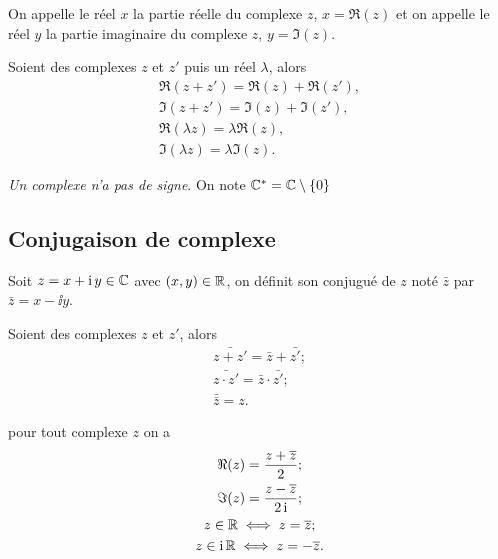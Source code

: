 %
On appelle le réel \(x\) la partie réelle du complexe \(z\), \(x=\Re(z)\) et on appelle le réel \(y\) la partie imaginaire du complexe \(z\), \(y=\Im(z)\).
%
\begin{prop}
  Soient des complexes \(z\) et \(z'\) puis un réel \(\lambda\), alors
  \begin{gather}
    \Re(z+z')=\Re(z)+\Re(z'), \\
    \Im(z+z')=\Im(z)+\Im(z'),\\
    \Re(\lambda z)=\lambda \Re(z),\\
    \Im(\lambda z)=\lambda \Im(z).
  \end{gather}
\end{prop}
%
\emph{Un complexe n'a pas de signe}. On note \(\mathbb{C}^*=\mathbb{C} \setminus \{0\}\)
%
\subsection{Conjugaison de complexe}
\label{subsec:conjugaisoncomplexe}
\begin{defdef}
  Soit \(z=x+\operatorname{i} y \in \mathbb{C}\) avec \((x,y)\in \mathbb{R}\), on définit son conjugué de \(z\) noté \(\bar{z}\) par \(\bar{z}=x- \ii y\).
\end{defdef}
\begin{prop}
  Soient des complexes \(z\) et \(z'\), alors
  \begin{gather}
    \bar{z+z'}=\bar{z} + \bar{z'}; \\
    \bar{z \cdot z'}=\bar{z} \cdot \bar{z'}; \\
    \bar{\bar{z}}=z.
  \end{gather}
\end{prop}
\begin{prop}
  pour tout complexe \(z\) on a
  \begin{gather}
    \Re(z)=\frac{z+\overline{z}}{2};\\
    \Im(z)=\frac{z-\overline{z}}{2 \operatorname{i}};\\
    z \in \mathbb{R} \iff z=\overline{z};\\
    z \in \operatorname{i}\mathbb{R} \iff z=-\overline{z}.
  \end{gather}
\end{prop}
%
